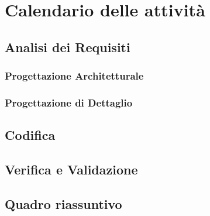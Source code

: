 \section{Calendario delle attività}
\subsection{Analisi dei Requisiti}
\subsubsection{Progettazione Architetturale}
\subsubsection{Progettazione di Dettaglio}
\subsection{Codifica}
\subsection{Verifica e Validazione}
\subsection{Quadro riassuntivo}